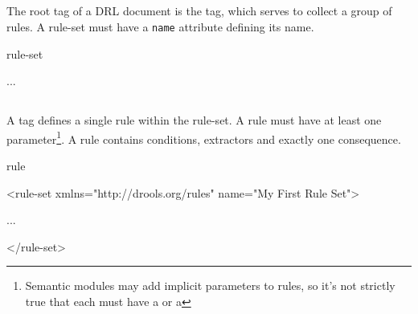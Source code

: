 
\subsection{}

The root tag of a DRL document is the  tag, which
serves to collect a group of rules. A rule-set must have a
\texttt{name} attribute defining its name.

\begin{tagDesc}{rule-set}
\attrs
{}
\tags
{}
\end{tagDesc}

\begin{center}
\begin{minipage}{0.8\textwidth}
\begin{tagExample}
\color{black}{<rule-set xmlns="http://drools.org/rules"}
          \color{black}{name="My First Rule Set">}
    ...
\color{black}{</rule-set>}
\end{tagExample}
\end{minipage}
\end{center}


\subsection{}

A  tag defines a single rule within the rule-set.  A rule
must have at least one parameter\footnote{Semantic modules may add
implicit parameters to rules, so it's not strictly true that each
 must have a  or a }.
A rule contains conditions, extractors and exactly one consequence. 

\begin{tagDesc}{rule}
\attrs
\tags
\end{tagDesc}

\begin{center}
\begin{minipage}{0.8\textwidth}
\begin{tagExample}
<rule-set xmlns="http://drools.org/rules" 
          name="My First Rule Set">

    \color{black}{<rule name="My First Rule">}
        ...
    \color{black}{</rule>}

</rule-set>
\end{tagExample}
\end{minipage}
\end{center}

